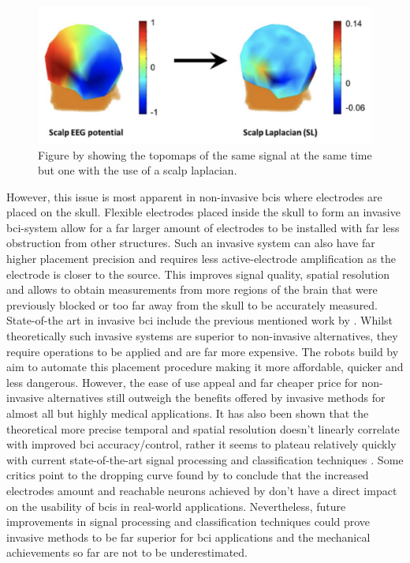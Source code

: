 \begin{figure}[ht]
    \centering
    \includegraphics[width=0.6\linewidth]{images/introduction/improve_eeg_spatial_comparison.png}
    \captionsetup{width=0.9\linewidth}
    \captionsetup{justification=centering}
    \caption{Figure by \citet{improve_eeg_spatial_comparison} showing the \glspl{topomap} of the same signal at the same time but one with the use of a scalp laplacian.}
    \label{fig:improve_eeg_spatial_comparison}
\end{figure}


However, this issue is most apparent in non-invasive \glspl{bci} where electrodes are placed on the skull.
Flexible electrodes placed inside the skull to form an invasive \gls{bci}-system allow for a far larger amount of electrodes to be installed with far less obstruction from other structures.
Such an invasive system can also have far higher placement precision and requires less active-electrode amplification as the electrode is closer to the source.
This improves signal quality, spatial resolution and allows to obtain measurements from more regions of the brain that were previously blocked or too far away from the skull to be accurately measured.
State-of-the art in invasive \gls{bci} include the previous mentioned work by \citet{neuralink_whitepaper}.
Whilst theoretically such invasive systems are superior to non-invasive alternatives, they require operations to be applied and are far more expensive.
The robots build by \citet{neuralink_whitepaper} aim to automate this placement procedure making it more affordable, quicker and less dangerous.
However, the ease of use appeal and far cheaper price for non-invasive alternatives still outweigh the benefits offered by invasive methods for almost all but highly medical applications.
It has also been shown that the theoretical more precise temporal and spatial resolution doesn't linearly correlate with improved \gls{bci} accuracy/control, rather it seems to plateau relatively quickly with current state-of-the-art signal processing and classification techniques \citep{dropping_curve_eeg_lectrodes, more_electrodes_not_better}.
Some critics point to the dropping curve found by \citet{dropping_curve_eeg_lectrodes} to conclude that the increased electrodes amount and reachable neurons achieved by \citet{neuralink_whitepaper} don't have a direct impact on the usability of \glspl{bci} in real-world applications.
Nevertheless, future improvements in signal processing and classification techniques could prove invasive methods to be far superior for \gls{bci} applications and the mechanical achievements so far are not to be underestimated.

